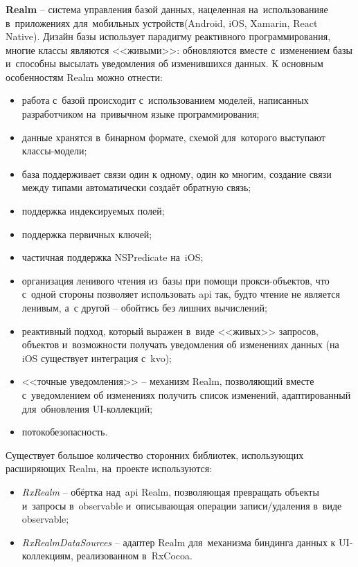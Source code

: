 \subsubsection{}
\label{sec:development:arch:ios:realm}

\textbf{Realm} -- система управления базой данных, нацеленная на~использованияе в~приложениях для~мобильных устройств(Android, iOS, Xamarin, React Native). Дизайн базы использует парадигму реактивного программирования, многие классы являются <<живыми>>: обновляются вместе с~изменением базы и~способны высылать уведомления об изменившихся данных. К основным особенностям Realm можно отнести:

\begin{itemize}
	\item работа с~базой происходит с~использованием моделей, написанных разработчиком на~привычном языке программирования;
	\item данные хранятся в~бинарном формате, схемой для~которого выступают классы-модели;
	\item база поддерживает связи один к одному, один ко многим, создание связи между типами автоматически создаёт обратную связь;
	\item поддержка индексируемых полей;
	\item поддержка первичных ключей;
	\item частичная поддержка NSPredicate на~iOS;
	\item организация ленивого чтения из~базы при помощи прокси-объектов, что с~одной стороны позволяет использовать \gls{api} так, будто чтение не является ленивым, а~с другой -- обойтись без лишних вычислений;
	\item реактивный подход, который выражен в~виде <<живых>> запросов, объектов и~возможности получать уведомления об изменениях данных (на iOS существует интеграция с~\gls{kvo});
	\item <<точные уведомления>> -- механизм Realm, позволяющий вместе с~уведомлением об изменениях получить список изменений, адаптированный для~обновления UI-коллекций;
	\item потокобезопасность.
\end{itemize}

Существует большое количество сторонних библиотек, использующих расширяющих Realm, на~проекте используются:

\begin{itemize}
	\item \emph{RxRealm} -- обёртка над~\gls{api} Realm, позволяющая превращать объекты и~запросы в~\gls{observable} и~описывающая операции записи/удаления в~виде \gls{observable};
	\item \emph{RxRealmDataSources} -- адаптер Realm для~механизма биндинга данных к UI-коллекциям, реализованном в~RxCocoa.
\end{itemize}